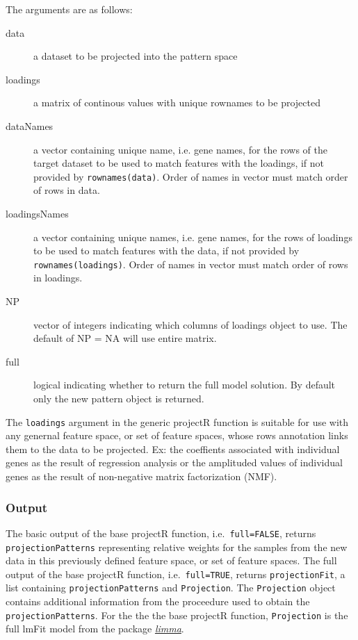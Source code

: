 \documentclass[]{article}
\begin{document}
The arguments are as follows:

\begin{description}
\item[data]{a dataset to be projected into the pattern space}
\item[loadings]{a matrix of continous values with unique rownames to be projected}
\item[dataNames]{a vector containing unique name, i.e. gene names, for the rows of the target dataset to be used to match features with the loadings, if not provided by \texttt{rownames(data)}. Order of names in vector must match order of rows in data.}
\item[loadingsNames]{a vector containing unique names, i.e. gene names, for the rows of loadings to be used to match features with the data, if not provided by \texttt{rownames(loadings)}. Order of names in vector must match order of rows in loadings.}
\item[NP]{vector of integers indicating which columns of loadings object to use. The default of NP = NA will use entire matrix.}
\item[full]{logical indicating whether to return the full model solution. By default only the new pattern object is returned.}
\end{description}

The \texttt{loadings} argument in the generic projectR function is suitable for use with any genernal feature space, or set of feature spaces, whose rows annotation links them to the data to be projected. Ex: the coeffients associated with individual genes as the result of regression analysis or the amplituded values of individual genes as the result of non-negative matrix factorization (NMF).

\hypertarget{output}{%
\subsubsection{Output}\label{output}}

The basic output of the base projectR function, i.e.~\texttt{full=FALSE}, returns \texttt{projectionPatterns} representing relative weights for the samples from the new data in this previously defined feature space, or set of feature spaces. The full output of the base projectR function, i.e.~\texttt{full=TRUE}, returns \texttt{projectionFit}, a list containing \texttt{projectionPatterns} and \texttt{Projection}. The \texttt{Projection} object contains additional information from the proceedure used to obtain the \texttt{projectionPatterns}. For the the the base projectR function, \texttt{Projection} is the full lmFit model from the package \emph{\href{https://bioconductor.org/packages/3.12/limma}{limma}}.
\end{document}
